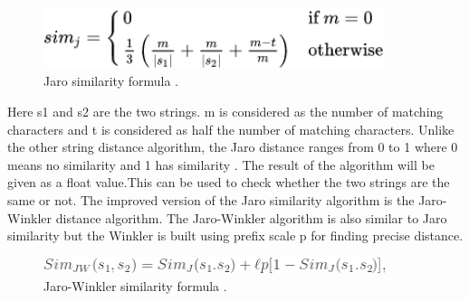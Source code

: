 \begin{figure}[h!]
	\includegraphics[width=10cm]{includes/jaro.png}
	\centering
	\caption{ Jaro similarity formula \cite{JaroWinkler}.}
	\label{fig:jaro}
\end{figure}
Here s1 and s2 are the two strings. m is considered as the number of matching characters and t is considered as half the number of matching characters. Unlike the other string distance algorithm, the Jaro distance ranges from 0 to 1 where 0 means no similarity and 1 has similarity \cite{Ak2021}. The result of the algorithm will be given as a float value.This can be used to check whether the two strings are the same or not. 
The improved version of the Jaro similarity algorithm is the Jaro-Winkler distance algorithm. The Jaro-Winkler algorithm is also similar to Jaro similarity but the Winkler is built using prefix scale p for finding precise distance.

\begin{figure}[h!]
	\includegraphics[width=10cm]{includes/jarowinkler.png}
	\centering
	\caption{ Jaro-Winkler similarity formula \cite{Stat2021}.}
	\label{fig:jarowinkler}
\end{figure}
